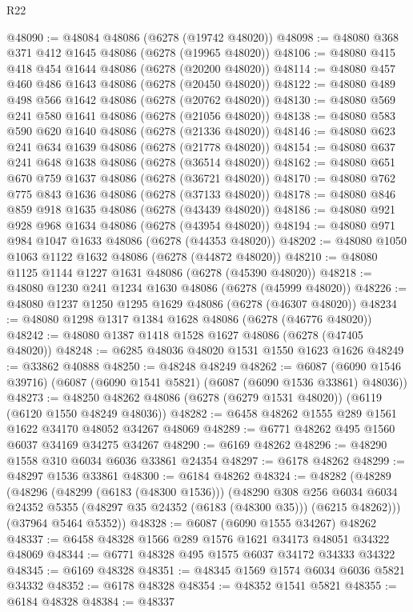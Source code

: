 \begin{lexlean}{R22}
\begin{coremodule}
@48090 := @48084 @48086 (@6278 (@19742 @48020))
@48098 := @48080 @368 @371 @412 @1645 @48086 (@6278 (@19965 @48020))
@48106 := @48080 @415 @418 @454 @1644 @48086 (@6278 (@20200 @48020))
@48114 := @48080 @457 @460 @486 @1643 @48086 (@6278 (@20450 @48020))
@48122 := @48080 @489 @498 @566 @1642 @48086 (@6278 (@20762 @48020))
@48130 := @48080 @569 @241 @580 @1641 @48086 (@6278 (@21056 @48020))
@48138 := @48080 @583 @590 @620 @1640 @48086 (@6278 (@21336 @48020))
@48146 := @48080 @623 @241 @634 @1639 @48086 (@6278 (@21778 @48020))
@48154 := @48080 @637 @241 @648 @1638 @48086 (@6278 (@36514 @48020))
@48162 := @48080 @651 @670 @759 @1637 @48086 (@6278 (@36721 @48020))
@48170 := @48080 @762 @775 @843 @1636 @48086 (@6278 (@37133 @48020))
@48178 := @48080 @846 @859 @918 @1635 @48086 (@6278 (@43439 @48020))
@48186 := @48080 @921 @928 @968 @1634 @48086 (@6278 (@43954 @48020))
@48194 := @48080 @971 @984 @1047 @1633 @48086 (@6278 (@44353 @48020))
@48202 := @48080 @1050 @1063 @1122 @1632 @48086 (@6278 (@44872 @48020))
@48210 := @48080 @1125 @1144 @1227 @1631 @48086 (@6278 (@45390 @48020))
@48218 := @48080 @1230 @241 @1234 @1630 @48086 (@6278 (@45999 @48020))
@48226 := @48080 @1237 @1250 @1295 @1629 @48086 (@6278 (@46307 @48020))
@48234 := @48080 @1298 @1317 @1384 @1628 @48086 (@6278 (@46776 @48020))
@48242 := @48080 @1387 @1418 @1528 @1627 @48086 (@6278 (@47405 @48020))
@48248 := @6285 @48036 @48020 @1531 @1550 @1623 @1626
@48249 := @33862 @40888
@48250 := @48248 @48249
@48262 := @6087 (@6090 @1546 @39716) (@6087 (@6090 @1541 @5821) (@6087 (@6090 @1536 @33861) @48036))
@48273 := @48250 @48262 @48086 (@6278 (@6279 @1531 @48020)) (@6119 (@6120 @1550 @48249 @48036))
@48282 := @6458 @48262 @1555 @289 @1561 @1622 @34170 @48052 @34267 @48069
@48289 := @6771 @48262 @495 @1560 @6037 @34169 @34275 @34267
@48290 := @6169 @48262
@48296 := @48290 @1558 @310 @6034 @6036 @33861 @24354
@48297 := @6178 @48262
@48299 := @48297 @1536 @33861
@48300 := @6184 @48262
@48324 := @48282
    (@48289
      (@48296
        (@48299 (@6183 (@48300 @1536)))
        (@48290
          @308
          @256
          @6034
          @6034
          @24352
          @5355
          (@48297 @35 @24352 (@6183 (@48300 @35)))
          (@6215 @48262)))
      (@37964 @5464 @5352))
@48328 := @6087 (@6090 @1555 @34267) @48262
@48337 := @6458 @48328 @1566 @289 @1576 @1621 @34173 @48051 @34322 @48069
@48344 := @6771 @48328 @495 @1575 @6037 @34172 @34333 @34322
@48345 := @6169 @48328
@48351 := @48345 @1569 @1574 @6034 @6036 @5821 @34332
@48352 := @6178 @48328
@48354 := @48352 @1541 @5821
@48355 := @6184 @48328
@48384 := @48337

\end{coremodule}
\end{lexlean}
